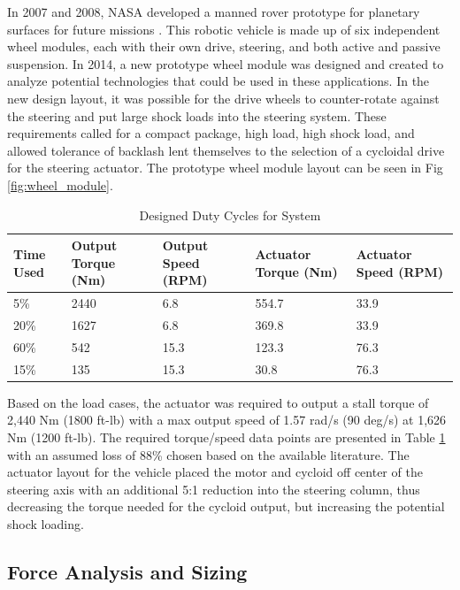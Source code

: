 In 2007 and 2008, NASA developed a manned rover prototype for planetary surfaces for future missions \cite{ref:rover}.
This robotic vehicle is made up of six independent wheel modules, each with their own drive, steering, and both active and passive suspension.
In 2014, a new prototype wheel module was designed and created to analyze potential technologies that could be used in these applications.
In the new design layout, it was possible for the drive wheels to counter-rotate against the steering and put large shock loads into the steering system.
These requirements called for a compact package, high load, high shock load, and allowed tolerance of backlash lent themselves to the selection of a cycloidal drive for the steering actuator.
The prototype wheel module layout can be seen in Fig \ref{fig:wheel_module}.

\begin{table}[h]
  \vskip0.2cm
  \caption{Designed Duty Cycles for System}
  \label{duty_cycle}
  \begin{center}
    \vskip-0.2cm
    \begin{tabular}{|p{}||p{}||p{}| |p{}| |p{}|}
    \hline
    Time Used & Output Torque (Nm) & Output Speed (RPM) & Actuator Torque (Nm) & Actuator Speed (RPM)\\
    \hline
    5\% & 2440 & 6.8 & 554.7 & 33.9\\
    \hline
    20\% & 1627 & 6.8 & 369.8 & 33.9\\
    \hline
    60\% & 542 & 15.3 & 123.3 & 76.3\\
    \hline
    15\% & 135 & 15.3 & 30.8 & 76.3\\
    \hline
    \end{tabular}
  \end{center}
\end{table}

Based on the load cases, the actuator was required to output a stall torque of 2,440 Nm (1800 ft-lb) with a max output speed of 1.57 rad/s (90 deg/s) at 1,626 Nm (1200 ft-lb).
The required torque/speed data points are presented in Table \ref{duty_cycle} with an assumed loss of 88\% chosen based on the available literature.
The actuator layout for the vehicle placed the motor and cycloid off center of the steering axis with an additional 5:1 reduction into the steering column, thus decreasing the torque needed for the cycloid output, but increasing the potential shock loading.

\subsection{Force Analysis and Sizing} \label{ch:design:single:force_analysis}

